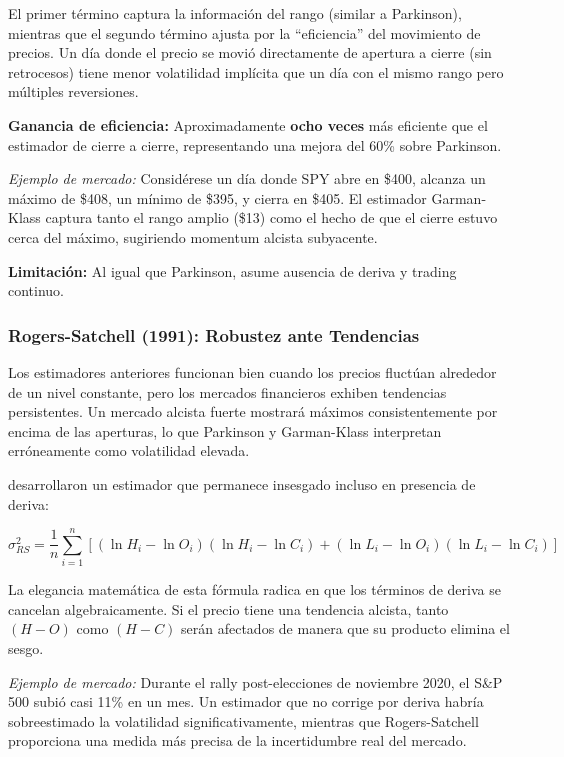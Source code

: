 \documentclass[11pt,a4paper]{article}
\begin{document}
El primer término captura la información del rango (similar a Parkinson), mientras que el segundo término ajusta por la ``eficiencia'' del movimiento de precios. Un día donde el precio se movió directamente de apertura a cierre (sin retrocesos) tiene menor volatilidad implícita que un día con el mismo rango pero múltiples reversiones.

\textbf{Ganancia de eficiencia:} Aproximadamente \textbf{ocho veces} más eficiente que el estimador de cierre a cierre, representando una mejora del 60\% sobre Parkinson.

\textit{Ejemplo de mercado:} Considérese un día donde SPY abre en \$400, alcanza un máximo de \$408, un mínimo de \$395, y cierra en \$405. El estimador Garman-Klass captura tanto el rango amplio (\$13) como el hecho de que el cierre estuvo cerca del máximo, sugiriendo momentum alcista subyacente.

\textbf{Limitación:} Al igual que Parkinson, asume ausencia de deriva y trading continuo.

\subsubsection{Rogers-Satchell (1991): Robustez ante Tendencias}

Los estimadores anteriores funcionan bien cuando los precios fluctúan alrededor de un nivel constante, pero los mercados financieros exhiben tendencias persistentes. Un mercado alcista fuerte mostrará máximos consistentemente por encima de las aperturas, lo que Parkinson y Garman-Klass interpretan erróneamente como volatilidad elevada.

\citet{rogers1991} desarrollaron un estimador que permanece insesgado incluso en presencia de deriva:

\begin{equation}
\sigma_{RS}^2 = \frac{1}{n}\sum_{i=1}^{n}\left[(\ln H_i - \ln O_i)(\ln H_i - \ln C_i) + (\ln L_i - \ln O_i)(\ln L_i - \ln C_i)\right]
\end{equation}

La elegancia matemática de esta fórmula radica en que los términos de deriva se cancelan algebraicamente. Si el precio tiene una tendencia alcista, tanto $(H - O)$ como $(H - C)$ serán afectados de manera que su producto elimina el sesgo.

\textit{Ejemplo de mercado:} Durante el rally post-elecciones de noviembre 2020, el S\&P 500 subió casi 11\% en un mes. Un estimador que no corrige por deriva habría sobreestimado la volatilidad significativamente, mientras que Rogers-Satchell proporciona una medida más precisa de la incertidumbre real del mercado.
\end{document}
